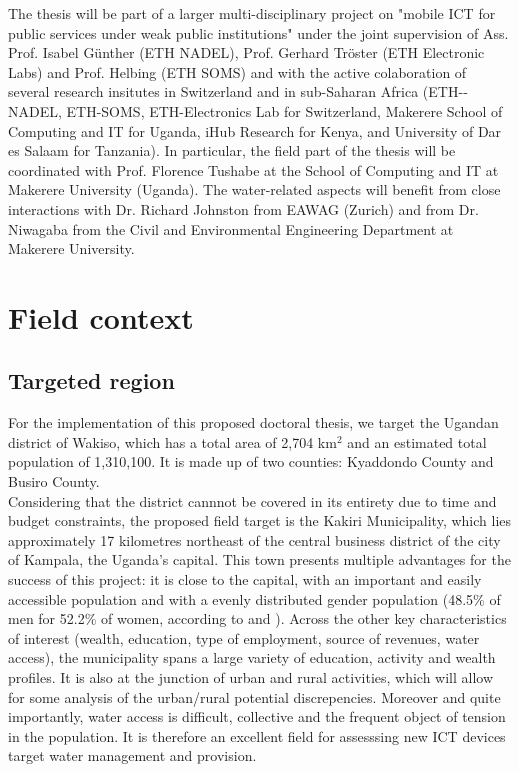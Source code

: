 \documentclass[11pt]{article}
\begin{document}
The thesis will be part of a larger multi-disciplinary project on "mobile ICT for public services under weak public institutions" under the joint supervision of Ass. Prof. Isabel Günther (ETH NADEL), Prof. Gerhard Tröster (ETH Electronic Labs) and Prof. Helbing (ETH SOMS) and with the active colaboration of several research insitutes in Switzerland and in sub-Saharan Africa (ETH-­NADEL, ETH-­SOMS, ETH-­Electronics Lab for Switzerland, Makerere School of Computing and IT for Uganda, iHub Research for Kenya, and University of Dar es Salaam for Tanzania). In particular, the field part of the thesis will be coordinated with Prof. Florence Tushabe at the School of Computing and IT at Makerere University (Uganda). The water-related aspects will benefit from close interactions with Dr. Richard Johnston from EAWAG (Zurich) and from Dr. Niwagaba from the Civil and Environmental Engineering Department at Makerere University.  

\section{Field context}
\subsection{Targeted region}
For the implementation of this proposed doctoral thesis, we target the Ugandan district of Wakiso, which has a total area of 2,704 km$^{2}$ and an estimated total population of 1,310,100. It is made up of two counties: Kyaddondo County and Busiro County. 
\\
Considering that the district cannnot be covered in its entirety due to time and budget constraints, the proposed field target is the Kakiri Municipality, which lies approximately 17 kilometres northeast of the central business district of the city of Kampala, the Uganda's capital. This town presents multiple advantages for the success of this project: it is close to the capital, with an important and easily accessible population and with a evenly distributed gender population (48.5\% of men for 52.2\% of women, according to \citep{population2010} and \citep{population02}). Across the other key characteristics of interest (wealth, education, type of employment, source of revenues, water access), the municipality spans a large variety of education, activity and wealth profiles. It is also at the junction of urban and rural activities, which will allow for some analysis of the urban/rural potential discrepencies. Moreover and quite importantly, water access is difficult, collective and the frequent object of tension in the population. It is therefore an excellent field for assesssing new ICT devices target water management and provision.
\end{document}
